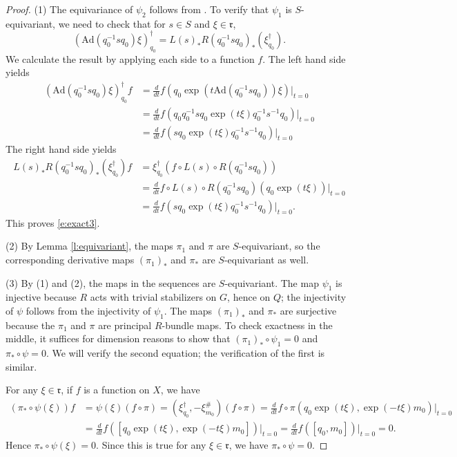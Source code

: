 \documentclass[11pt,letterpaper,reqno]{amsart}
\newcommand{\fr}{{\mathfrak r}}
\numberwithin{equation}{section}
\theoremstyle{plain}
\theoremstyle{definition}
\theoremstyle{remark}
\newcommand{\Ad}{\mathrm{Ad}}
\begin{document}
\begin{proof}
(1) The equivariance of $\psi_2$ follows from \cite[Lemma 3.1]{GZ}.  To verify that $\psi_1$ is $S$-equivariant, we need to check that for $s \in S$ and $\xi \in \fr$,
\begin{equation} \label{e:exact3}
({\Ad(q_0^{-1} s q_0) \xi})^{\dagger}_{q_0} = L(s)_* R(q_0^{-1} s q_0)_* (\xi^{\dagger}_{q_0}).
\end{equation}
We calculate the result by applying each side to a function $f$.  The left hand side yields
\begin{align*}
({\Ad(q_0^{-1} s q_0) \xi})^{\dagger}_{q_0} f & = \frac{d}{dt} f( q_0 \exp (t \Ad(q_0^{-1} s q_0) ) \xi) \Big|_{t=0} \\
& = \frac{d}{dt} f( q_0 q_0^{-1} s q_0 \exp(t \xi) q_0^{-1} s^{-1} q_0 )  \Big|_{t=0} \\
& = \frac{d}{dt} f( s q_0 \exp(t \xi) q_0^{-1} s^{-1} q_0 )  \Big|_{t=0} 
\end{align*}
The right hand side yields
\begin{align*}
L(s)_* R(q_0^{-1} s q_0)_* (\xi^{\dagger}_{q_0}) f & = \xi^{\dagger}_{q_0} (f \circ L(s) \circ R(q_0^{-1} s q_0) ) \\
 & =  \frac{d}{dt} f \circ L(s) \circ R(q_0^{-1} s q_0) (q_0 \exp(t \xi))  \Big|_{t=0} \\
 & =  \frac{d}{dt} f( s q_0 \exp(t \xi) q_0^{-1} s^{-1} q_0 )  \Big|_{t=0} .
\end{align*}
This proves \eqref{e:exact3}.  

(2) By Lemma \ref{l:equivariant}, the maps $\pi_1$ and $\pi$ are $S$-equivariant, so the corresponding derivative maps $(\pi_1)_*$ and $\pi_*$ are $S$-equivariant as well.

(3) By (1) and (2), the maps in the sequences are $S$-equivariant.  The map $\psi_1$ is injective because $R$ acts with trivial stabilizers on $G$, hence on
$Q$; the injectivity of $\psi$ follows from the injectivity of $\psi_1$.  The maps $(\pi_1)_*$ and $\pi_*$ are surjective because the
 $\pi_1$ and $\pi$ are principal $R$-bundle maps.  To check exactness in the middle, it suffices for dimension reasons 
 to show that  $(\pi_1)_* \circ \psi_1 = 0$ and $\pi_* \circ \psi = 0$.  We will verify the second equation; the verification of the first is similar.

For any $\xi \in \fr$, if $f$ is a function on $X$, we have
\begin{align*}
( \pi_* \circ \psi (\xi)) f & = \psi(\xi) (f \circ \pi) = (\xi^{\dagger}_{q_0}, - \xi^{\#}_{m_0} ) (f \circ \pi) =  \frac{d}{dt} f \circ \pi (q_0 \exp (t \xi), \exp (-t \xi) m_0)  \Big|_{t=0} \\
& =  \frac{d}{dt} f([q_0 \exp (t \xi), \exp (-t \xi) m_0]) \Big|_{t=0} =  \frac{d}{dt} f([q_0 , m_0]) \Big|_{t=0} = 0.
\end{align*}
 Hence $\pi_* \circ \psi (\xi) = 0$.  Since this is true for any $\xi \in \fr$, we have $\pi_* \circ \psi = 0$. 
\end{proof}
\end{document}
